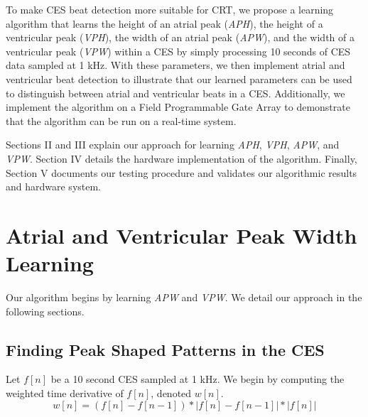 \documentclass[conference]{IEEEtran}
\newcommand{\APW}{\textit{APW}}
\newcommand{\VPW}{\textit{VPW}}
\newcommand{\APH}{\textit{APH}}
\newcommand{\VPH}{\textit{VPH}}
\begin{document}
To make CES beat detection more suitable for CRT,
we propose a learning algorithm that learns the
height of an atrial peak (\APH), the height of a ventricular
peak (\VPH), the width of an atrial peak (\APW), and the
width of a ventricular peak (\VPW) within a CES %
by simply processing 10 seconds of CES data sampled
at 1 kHz. With these parameters, we then implement
atrial and ventricular beat detection to illustrate that our
learned parameters can be used to distinguish between
atrial and ventricular beats in a CES.
Additionally, we implement the algorithm on a Field
Programmable Gate Array to demonstrate that the
algorithm can be run on a real-time system.

Sections II and III explain our approach
for learning \APH{}, \VPH{}, \APW{}, and \VPW{}. Section IV
details the hardware implementation of the algorithm.
Finally, Section V documents our testing procedure and
validates our algorithmic results and hardware system.

\section{Atrial and Ventricular Peak Width Learning}
Our algorithm begins by learning \APW{} and \VPW{}. We
detail our approach in the following sections.

\subsection{Finding Peak Shaped Patterns in the CES}
Let $f[n]$ be a 10 second CES sampled at 1 kHz.
We begin by computing the weighted time
derivative of $f[n]$, denoted $w[n]$.
\begin{equation*}
	w[n]=(f[n]-f[n-1]) * \left|f[n] - f[n-1]\right| * \left|f[n]\right|
\end{equation*}
\end{document}
